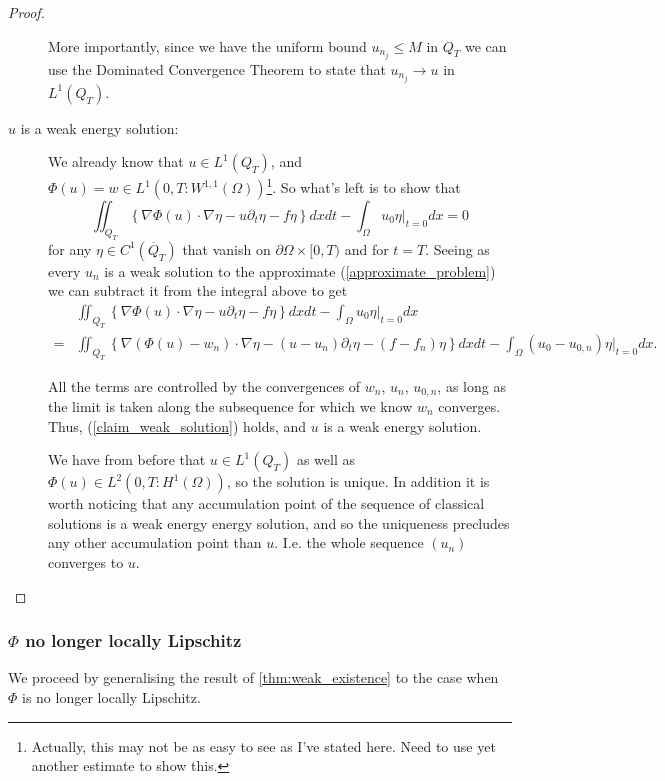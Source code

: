 \documentclass[11pt, a4paper]{article}
\begin{document}
\begin{proof}
\begin{description}
	 More importantly, since we have the uniform bound $u_{n_j} \leq M$ in $Q_T$ we can use the Dominated Convergence Theorem to state that $u_{n_j} \to u$ in $L^1(Q_T)$.
	
	 
	\item[$u$ is a weak energy solution:] We already know that $u \in L^1(Q_T)$, and $\Phi(u)=w \in L^1(0,T: W^{1,1}(\Omega))$\footnote{Actually, this may not be as easy to see as I've stated here. Need to use yet another estimate to show this.}. So what's left is to show that
	\begin{equation}
	\label{claim_weak_solution}
	\iint_{Q_T}\left\{ \nabla\Phi(u) \cdot \nabla \eta - u\partial_t \eta - f\eta \right\}dxdt - \int_\Omega u_0\eta\big|_{t=0}dx = 0
	\end{equation}
	for any $\eta \in C^1(\overline{Q}_T)$ that vanish on $\partial \Omega \times [0,T)$ and for $t=T$. Seeing as every $u_n$ is a weak solution to the approximate (\ref{approximate_problem}) we can subtract it from the integral above to get
	\begin{align*}
	&\iint_{Q_T}\left\{ \nabla\Phi(u) \cdot \nabla \eta - u\partial_t \eta - f\eta \right\}dxdt - \int_\Omega u_0\eta\big|_{t=0}dx \\
	= &\iint_{Q_T}\left\{ \nabla(\Phi(u)-w_n) \cdot \nabla \eta - (u-u_n)\partial_t \eta - (f-f_n)\eta \right\}dxdt - \int_\Omega (u_0-u_{0,n})\eta\big|_{t=0}dx.
	\end{align*}
	
	All the terms are controlled by the convergences of $w_n$, $u_n$, $u_{0,n}$, as long as the limit is taken along the subsequence for which we know $w_n$ converges. Thus, (\ref{claim_weak_solution}) holds, and $u$ is a weak energy solution.
	
	We have from before that $u\in L^1(Q_T)$ as well as $\Phi(u) \in L^2(0,T: H^1(\Omega))$, so the solution is unique. In addition it is worth noticing that any accumulation point of the sequence of classical solutions is a weak energy energy solution, and so the uniqueness precludes any other accumulation point than $u$. I.e. the whole sequence $(u_n)$ converges to $u$.

\end{description}


\end{proof}


\subsubsection{$\Phi$ no longer locally Lipschitz}
We proceed by generalising the result of \ref{thm:weak_existence} to the case when $\Phi$ is no longer locally Lipschitz.
\end{document}
